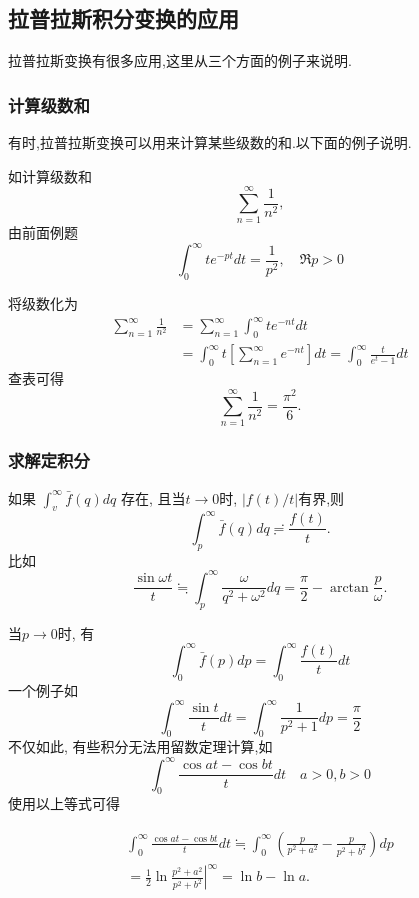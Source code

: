 \subsection{拉普拉斯积分变换的应用}
\label{subsec:applications}
拉普拉斯变换有很多应用,这里从三个方面的例子来说明.
\subsubsection{计算级数和}
有时,拉普拉斯变换可以用来计算某些级数的和.以下面的例子说明.

如计算级数和
$$
    \sum_{n=1} ^{\infty}  \frac{1}{n^2},
$$
由前面例题
$$
\int_0^{\infty} t e^{-p t} d t=\frac{1}{p^2}, \quad \Re p>0
$$

将级数化为
$$
\begin{aligned}
\sum_{n= 1}^{\infty} \frac{1}{n^2} & =\sum_{n=1}^{\infty} \int_0^{\infty} t e^{-n t} d t \\
& =\int_0^{\infty} t\left[\sum_{n=1}^{\infty} e^{-n t}\right] d t=\int_0^{\infty} \frac{t}{e^t-1} d t
\end{aligned}
$$
查表可得
\begin{equation}
    \sum_{n=1} ^{\infty}  \frac{1}{n^2} = \frac{\pi^2}{6}.
\end{equation}

\subsubsection{求解定积分}
如果 $\int_v^{\infty} \bar{f}(q) d q$ 存在, 且当$t\to 0$时, $|f(t)/t|$有界,则
\begin{equation}
    \int_{p}^{\infty} \bar{f}(q) dq \risingdotseq \frac{f(t)}{t} . 
\end{equation}
比如
$$
\frac{\sin \omega t}{t} \fallingdotseq \int_p^{\infty} \frac{\omega}{q^2+\omega^2} d q=\frac{\pi}{2}-\arctan \frac{p}{\omega}.
$$

当$p\to 0$时, 有
\begin{equation}
    \int_0^{\infty} \bar{f}(p) d p=\int_0^{\infty} \frac{f(t)}{t} d t
\end{equation}
一个例子如
$$
\int_0^{\infty} \frac{\sin t}{t} d t=\int_0^{\infty} \frac{1}{p^2+1} d p=\frac{\pi}{2}
$$
不仅如此, 有些积分无法用留数定理计算,如
$$
\int_0^{\infty} \frac{\cos a t-\cos b t}{t} d t \quad a>0, b>0
$$
使用以上等式可得

$$
\begin{gathered}
\int_0^{\infty} \frac{\cos a t-\cos b t}{t} d t \fallingdotseq \int_0^{\infty}\left(\frac{p}{p^2+a^2}-\frac{p}{p^2+b^2}\right) d p \\
=\left.\frac{1}{2} \ln \frac{p^2+a^2}{p^2+b^2}\right|^{\infty}=\ln b-\ln a .
\end{gathered}
$$

